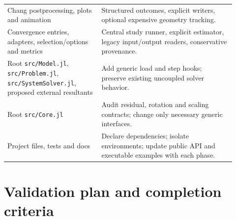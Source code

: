 \documentclass[11pt,a4paper]{article}
\newcommand{\code}{\nolinkurl}
\begin{document}
\begin{longtable}{@{}L{0.38\linewidth}L{0.54\linewidth}@{}}
Chang postprocessing, plots and animation & Structured outcomes, explicit
writers, optional expensive geometry tracking.\\
Convergence entries, adapters, selection/options and metrics & Central study
runner, explicit estimator, legacy input/output readers, conservative provenance.\\
Root \code{src/Model.jl}, \code{src/Problem.jl},
\code{src/SystemSolver.jl}, proposed external resultants & Add generic load
and step hooks; preserve existing uncoupled solver behavior.\\
Root \code{src/Core.jl} & Audit residual, rotation and scaling contracts;
change only necessary generic interfaces.\\
Project files, tests and docs & Declare dependencies; isolate environments;
update public API and executable examples with each phase.\\
\bottomrule
\end{longtable}
\endgroup

\section{Validation plan and completion criteria}
\end{document}
